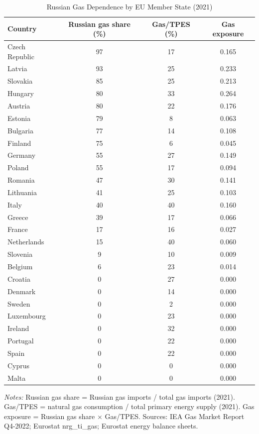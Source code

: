 \documentclass[12pt]{article}
\begin{document}
\begin{table}[H]
\centering
\caption{Russian Gas Dependence by EU Member State (2021)}
\label{tab:gas_dep_detail}
\small
\begin{tabular}{lccc}
\toprule
Country & Russian gas share (\%) & Gas/TPES (\%) & Gas exposure \\
\midrule
Czech Republic & 97 & 17 & 0.165 \\
Latvia & 93 & 25 & 0.233 \\
Slovakia & 85 & 25 & 0.213 \\
Hungary & 80 & 33 & 0.264 \\
Austria & 80 & 22 & 0.176 \\
Estonia & 79 & 8 & 0.063 \\
Bulgaria & 77 & 14 & 0.108 \\
Finland & 75 & 6 & 0.045 \\
Germany & 55 & 27 & 0.149 \\
Poland & 55 & 17 & 0.094 \\
Romania & 47 & 30 & 0.141 \\
Lithuania & 41 & 25 & 0.103 \\
Italy & 40 & 40 & 0.160 \\
Greece & 39 & 17 & 0.066 \\
France & 17 & 16 & 0.027 \\
Netherlands & 15 & 40 & 0.060 \\
Slovenia & 9 & 10 & 0.009 \\
Belgium & 6 & 23 & 0.014 \\
Croatia & 0 & 27 & 0.000 \\
Denmark & 0 & 14 & 0.000 \\
Sweden & 0 & 2 & 0.000 \\
Luxembourg & 0 & 23 & 0.000 \\
Ireland & 0 & 32 & 0.000 \\
Portugal & 0 & 22 & 0.000 \\
Spain & 0 & 22 & 0.000 \\
Cyprus & 0 & 0 & 0.000 \\
Malta & 0 & 0 & 0.000 \\
\bottomrule
\end{tabular}
\begin{tablenotes}[flushleft]
\small
\item \textit{Notes:} Russian gas share = Russian gas imports / total gas imports (2021). Gas/TPES = natural gas consumption / total primary energy supply (2021). Gas exposure = Russian gas share $\times$ Gas/TPES. Sources: IEA Gas Market Report Q4-2022; Eurostat nrg\_ti\_gas; Eurostat energy balance sheets.
\end{tablenotes}
\end{table}
\end{document}
